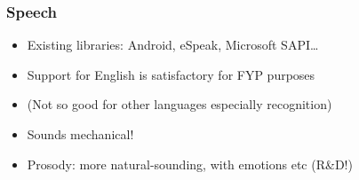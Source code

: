 \begin{frame}
\frametitle{Speech}

\begin{itemize}[<+->]
\item Existing libraries: Android, eSpeak, Microsoft SAPI\ldots
\item Support for English is satisfactory for FYP purposes
\item (Not so good for other languages especially recognition)
\item Sounds mechanical!
\item Prosody: more natural-sounding, with emotions etc (R\&D!)
\end{itemize}
\end{frame}



